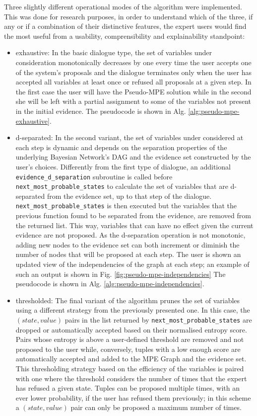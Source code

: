 Three slightly different operational modes of the algorithm were implemented.
This was done for research purposes, in order to understand which of the three, if any or if a combination of their distinctive features, the expert users would find the most useful from a usability, comprensibility and explainability standpoint:
\begin{itemize}
  \item exhaustive: In the basic dialogue type, the set of variables under consideration monotonically decreases by one every time the user accepts one of the system's proposals and the dialogue terminates only when the user has accepted all variables at least once or refused all proposals at a given step.
	In the first case the user will have the Pseudo-MPE solution while in the second she will be left with a partial assignment to some of the variables not present in the initial evidence.
	The pseudocode is shown in Alg. \ref{alg:pseudo-mpe-exhaustive}.
  \item d-separated: In the second variant, the set of variables under considered at each step is dynamic and depends on the separation properties of the underlying Bayesian Network's DAG and the evidence set constructed by the user's choices.
  	Differently from the first type of dialogue, an additional \texttt{evidence\_d\_separation} subroutine is called before \texttt{next\_most\_probable\_states} to calculate the set of variables that are d-separated from the evidence set, up to that step of the dialogue.
  	\texttt{next\_most\_probable\_states} is then executed but the variables that the previous function found to be separated from the evidence, are removed from the returned list.
  	This way, variables that can have no effect given the current evidence are not proposed.
  	As the d-separation operation is not monotonic, adding new nodes to the evidence set can both increment or diminish the number of nodes that will be proposed at each step.
  	The user is shown an updated view of the independencies of the graph at each step; an example of such an output is shown in Fig. \ref{fig:pseudo-mpe-independencies}
  	The pseudocode is shown in Alg. \ref{alg:pseudo-mpe-independencies}.
  \item thresholded: The final variant of the algorithm prunes the set of variables using a different strategy from the previously presented one.
  	In this case, the $(state,value)$ pairs in the list returned by \texttt{next\_most\_probable\_states} are dropped or automatically accepted based on their normalised entropy score.
  	Pairs whose entropy is above a user-defined threshold are removed and not proposed to the user while, conversely, tuples with a low enough score are automatically accepted and added to the MPE Graph and the evidence set.
  	This thresholding strategy based on the efficiency of the variables is paired with one where the threshold considers the number of times that the expert has refused a given state. Tuples can be proposed multiple times, with an ever lower probability, if the user has refused them previously; in this scheme a $(state,value)$ pair can only be proposed a maximum number of times.
\end{itemize}

